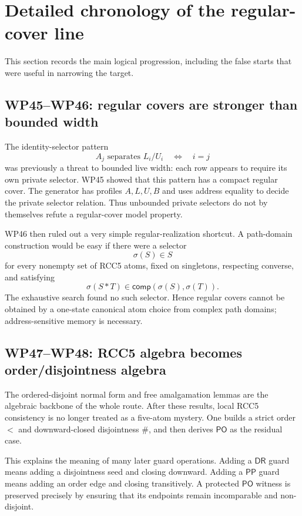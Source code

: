 \documentclass[11pt]{article}
\newcommand{\PP}{\mathsf{PP}}
\newcommand{\PO}{\mathsf{PO}}
\newcommand{\DR}{\mathsf{DR}}
\newcommand{\comp}{\mathsf{comp}}
\begin{document}
\section{Detailed chronology of the regular-cover line}

This section records the main logical progression, including the false starts that were useful in narrowing the target.

\subsection{WP45--WP46: regular covers are stronger than bounded width}

The identity-selector pattern
\[
A_j\text{ separates }L_i/U_i\quad\Longleftrightarrow\quad i=j
\]
was previously a threat to bounded live width: each row appears to require its own private selector.  WP45 showed that this pattern has a compact regular cover.  The generator has profiles $A,L,U,B$ and uses address equality to decide the private selector relation.  Thus unbounded private selectors do not by themselves refute a regular-cover model property.

WP46 then ruled out a very simple regular-realization shortcut.  A path-domain construction would be easy if there were a selector
\[
\sigma(S)\in S
\]
for every nonempty set of RCC5 atoms, fixed on singletons, respecting converse, and satisfying
\[
\sigma(S*T)\in\comp(\sigma(S),\sigma(T)).
\]
The exhaustive search found no such selector.  Hence regular covers cannot be obtained by a one-state canonical atom choice from complex path domains; address-sensitive memory is necessary.

\subsection{WP47--WP48: RCC5 algebra becomes order/disjointness algebra}

The ordered-disjoint normal form and free amalgamation lemmas are the algebraic backbone of the whole route.  After these results, local RCC5 consistency is no longer treated as a five-atom mystery.  One builds a strict order $<$ and downward-closed disjointness $\#$, and then derives $\PO$ as the residual case.

This explains the meaning of many later guard operations.  Adding a $\DR$ guard means adding a disjointness seed and closing downward.  Adding a $\PP$ guard means adding an order edge and closing transitively.  A protected $\PO$ witness is preserved precisely by ensuring that its endpoints remain incomparable and non-disjoint.
\end{document}
